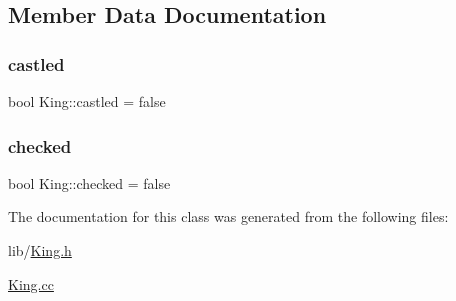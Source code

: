 \subsection{Member Data Documentation}
\mbox{\label{class_king_af1d6712d05b377b1989d7625e5aceb38}} 
\subsubsection{\texorpdfstring{castled}{castled}}
{\footnotesize\ttfamily bool King\+::castled = false\hspace{0.3cm}{\ttfamily [private]}}

\mbox{\label{class_king_afd51388c6257f775868f8bde25591a31}} 
\subsubsection{\texorpdfstring{checked}{checked}}
{\footnotesize\ttfamily bool King\+::checked = false\hspace{0.3cm}{\ttfamily [private]}}



The documentation for this class was generated from the following files\+:\begin{DoxyCompactItemize}
\item 
lib/\hyperlink{_king_8h}{King.\+h}\item 
\hyperlink{_king_8cc}{King.\+cc}\end{DoxyCompactItemize}
